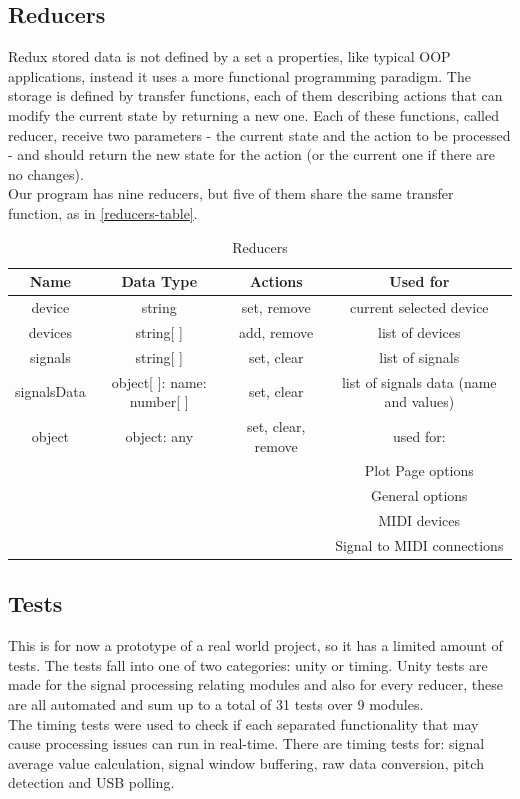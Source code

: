 \subsection{Reducers}
Redux stored data is not defined by a set a properties, like typical OOP applications,
instead it uses a more functional programming paradigm. The storage is defined by transfer
functions, each of them describing actions that can modify the current state by
returning a new one. Each of these functions, called reducer, receive two parameters -
the current state and the action to be processed - and should return the new state
for the action (or the current one if there are no changes). \\
Our program has nine reducers, but five of them share the same transfer function,
as in \autoref{reducers-table}.
\begin{table}[htb]
  \ABNTEXreducedfont
  \caption[Reducers]{Reducers}
  \label{reducers-table}
  \centering
  \begin{tabular}{c|c|c|c}
    \textbf{Name} & \textbf{Data Type} & \textbf{Actions} & \textbf{Used for} \\
    \hline
		device & string & set, remove & current selected device \\
		\hline
		devices & string[ ] & add, remove & list of devices \\
		\hline
		signals & string[ ] & set, clear & list of signals \\
		\hline
		signalsData & object[ ]: {name: number[ ]} & set, clear & list of signals data (name and values) \\
		\hline
		object & object: any & set, clear, remove & used for: \\
																					& & & Plot Page options \\
																					& & & General options \\
																					& & & MIDI devices \\
																					& & & Signal to MIDI connections \\

  \end{tabular}
\end{table}

\subsection{Tests}
This is for now a prototype of a real world project, so it has a limited amount
of tests. The tests fall into one of two categories: unity or timing. Unity tests
are made for the signal processing relating modules and also for every reducer,
these are all automated and sum up to a total of 31 tests over 9 modules. \\
The timing tests were used to check if each separated functionality that may
cause processing issues can run in real-time. There are timing tests for: signal
average value calculation, signal window buffering, raw data conversion,
pitch detection and USB polling.
